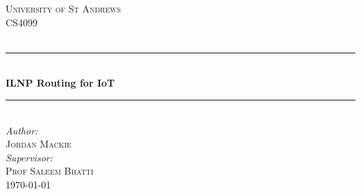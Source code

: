 \documentclass[12pt]{article}
\begin{document}
\begin{titlepage}

\newcommand{\HRule}{\rule{\linewidth}{0.5mm}} %

\center %
 

\textsc{\LARGE University of St Andrews}\\[1.5cm] %
\textsc{\Large CS4099}\\[0.5cm] %
\textsc{\large }\\[0.5cm] %


\HRule \\[0.4cm]
{ \huge \bfseries ILNP Routing for IoT}\\[0.4cm] %
\HRule \\[1.5cm]
 


\Large \emph{Author:}\\
 \textsc{Jordan Mackie}\\[1cm] %
 
\Large \emph{Supervisor:}\\
 \textsc{Prof Saleem Bhatti}\\[1cm] %

{\large \today}\\[2cm] %



\end{titlepage}
\end{document}

